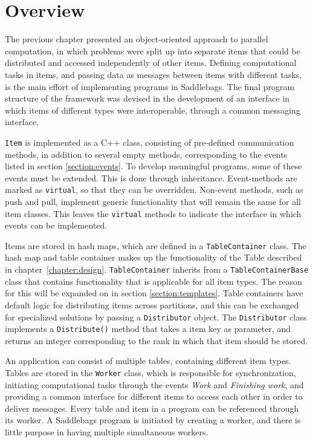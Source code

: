 \documentclass{uit-report}
\begin{document}
\section{Overview}
The previous chapter presented an object-oriented approach to parallel computation, in which problems were split up into separate items that could be distributed and accessed independently of other items. Defining computational tasks in items, and passing data as messages between items with different tasks, is the main effort of implementing programs in Saddlebags. The final program structure of the framework was devised in the development of an interface in which items of different types were interoperable, through a common messaging interface.

\texttt{Item} is implemented as a C++ class, consisting of pre-defined communication methods, in addition to several empty methods, corresponding to the events listed in section \ref{section:events}. To develop meaningful programs, some of these events must be extended. This is done through inheritance. Event-methods are marked as \texttt{virtual}, so that they can be overridden. Non-event methods, such as push and pull, implement generic functionality that will remain the same for all item classes. This leaves the \texttt{virtual} methods to indicate the interface in which events can be implemented. 

Items are stored in hash maps, which are defined in a \texttt{TableContainer} class. The hash map and table container makes up the functionality of the Table described in chapter~\ref{chapter:design}. \texttt{TableContainer} inherits from a \texttt{TableContainerBase} class that contains functionality that is applicable for all item types. The reason for this will be expanded on in section \ref{section:templates}. Table containers have default logic for distributing items across partitions, and this can be exchanged for specialized solutions by passing a \texttt{Distributor} object. The \texttt{Distributor} class implements a \texttt{Distribute()} method that takes a item key as parameter, and returns an integer corresponding to the rank in which that item should be stored. 

An application can consist of multiple tables, containing different item types. Tables are stored in the \texttt{Worker} class, which is responsible for synchronization, initiating computational tasks through the events \emph{Work} and \emph{Finishing work}, and providing a common interface for different items to access each other in order to deliver messages. Every table and item in a program can be referenced through its worker. A Saddlebags program is initiated by creating a worker, and there is little purpose in having multiple simultaneous workers.
\end{document}
